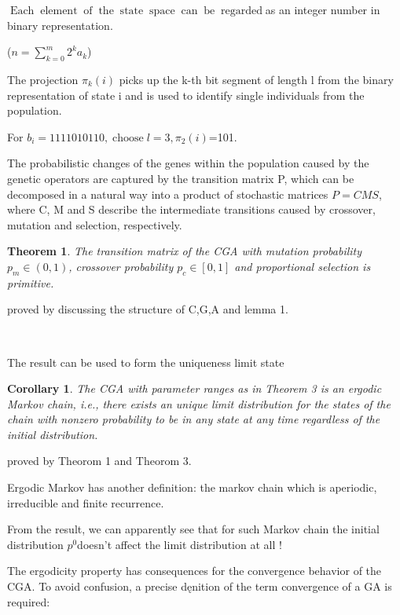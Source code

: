 \documentclass{article}
\newcommand{\tmop}[1]{\ensuremath{\operatorname{#1}}}
\newtheorem{corollary}{Corollary}
\newtheorem{theorem}{Theorem}
\begin{document}
$\tmop{Each} \tmop{element} \tmop{of} \tmop{the} \tmop{state} \tmop{space}
\tmop{can} \tmop{be} \tmop{regarded}$as an integer number in binary
representation.

($n = \sum^m_{k = 0} 2^k a_k$)

The projection $\pi_k (i)$ picks up the k-th bit segment of length l from the
binary representation of state i and is used to identify single individuals
from the population.

\begin{example}
  For $b_i = 1111010110, \tmop{choose} l = 3, \pi_2 (i)$=101.
\end{example}

The probabilistic changes of the genes within the population caused by the
genetic operators are captured by the transition matrix P, which can be
decomposed in a natural way into a product of stochastic matrices $P = C M S$,
where C, M and S describe the intermediate transitions caused by crossover,
mutation and selection, respectively.

\begin{theorem}
  The transition matrix of the CGA with mutation probability $p_m \in (0, 1)$,
  crossover probability $p_c \in [0, 1]$ and proportional selection is
  primitive.
\end{theorem}

proved by discussing the structure of C,G,A and lemma 1.

\

The result can be used to form the uniqueness limit state

\begin{corollary}
  The CGA with parameter ranges as in Theorem 3 is an ergodic Markov chain,
  i.e., there exists an unique limit distribution for the states of the chain
  with nonzero probability to be in any state at any time regardless of the
  initial distribution.
\end{corollary}

proved by Theorom 1 and Theorom 3.

\begin{remark}
  Ergodic Markov has another definition: the markov chain which is aperiodic,
  irreducible and finite recurrence.
\end{remark}

From the result, we can apparently see that for such Markov chain the initial
distribution $p ^0 $doesn't affect the limit distribution at all !

The ergodicity property has consequences for the convergence behavior of the
CGA. To avoid confusion, a precise de\k{}nition of the term convergence of a
GA is required:
\end{document}
